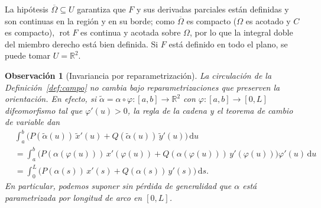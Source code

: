 \documentclass[12pt,a4paper]{article}
\theoremstyle{profesional}
\theoremstyle{definicion-style}
\newtheorem{observacion}[teorema]{Observación}
\newcommand{\R}{\mathbb{R}}
\begin{document}
La hipótesis \( \overline{\Omega} \subseteq U \) garantiza que \( F \) y sus derivadas parciales están definidas y son continuas en la región y en su borde; como \( \overline{\Omega} \) es compacto (\( \Omega \) es acotado y \( C \) es compacto),
\( \operatorname{rot} F \) es continua y acotada sobre \( \Omega \), por lo que la integral doble del miembro derecho está bien definida. Si \( F \) está definido en todo el plano, se puede tomar \( U = \R^2 \).

\begin{observacion}[Invariancia por reparametrización]\label{obs:reparam}
    La circulación de la Definición~\ref{def:campo} no cambia bajo reparametrizaciones que preserven la orientación. En efecto, si \( \tilde{\alpha} = \alpha \circ \varphi : [a, b] \to \R^2 \) con \( \varphi : [a, b] \to [0, L] \) difeomorfismo tal que \( \varphi'(u) > 0 \), la regla de la cadena y el teorema de cambio de variable dan
    \begin{align*}
         & \int_a^b \Big( P(\tilde{\alpha}(u)) \, \tilde{x}'(u) + Q(\tilde{\alpha}(u)) \, \tilde{y}'(u) \Big) \, \mathrm{d}u \\ & = \int_a^b \Big( P(\alpha(\varphi(u))) \, x'(\varphi(u)) + Q(\alpha(\varphi(u))) \, y'(\varphi(u)) \Big) \varphi'(u) \, \mathrm{d}u \\
         & = \int_0^L \Big( P(\alpha(s)) \, x'(s) + Q(\alpha(s)) \, y'(s) \Big) \, \mathrm{d}s.
    \end{align*}
    En particular, podemos suponer sin pérdida de generalidad que \( \alpha \) está parametrizada por longitud de arco en \( [0, L] \).
\end{observacion}
\end{document}
